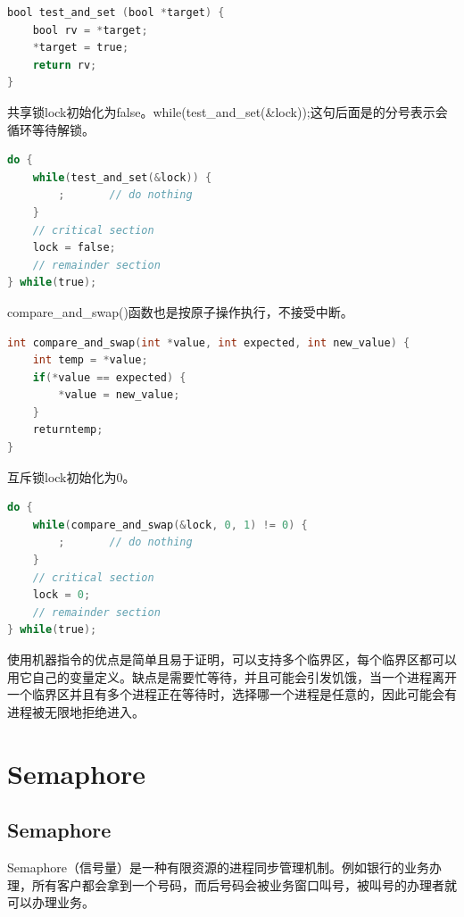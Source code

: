 \begin{lstlisting}[language=C]
bool test_and_set (bool *target) {
	bool rv = *target;
	*target = true;
	return rv;
}
\end{lstlisting}

共享锁lock初始化为false。while(test\_and\_set(\&lock));这句后面是的分号表示会循环等待解锁。

\vspace{-0.5cm}

\begin{lstlisting}[language=C]
do {
	while(test_and_set(&lock)) {
		;		// do nothing
	}
	// critical section
	lock = false;
	// remainder section
} while(true);
\end{lstlisting}

compare\_and\_swap()函数也是按原子操作执行，不接受中断。

\vspace{-0.5cm}

\begin{lstlisting}[language=C]
int compare_and_swap(int *value, int expected, int new_value) {
	int temp = *value;
	if(*value == expected) {
		*value = new_value;
	}
	returntemp;
}
\end{lstlisting}

互斥锁lock初始化为0。

\vspace{-0.5cm}

\begin{lstlisting}[language=C]
do {
	while(compare_and_swap(&lock, 0, 1) != 0) {
		;		// do nothing
	}
	// critical section
	lock = 0;
	// remainder section
} while(true);
\end{lstlisting}

使用机器指令的优点是简单且易于证明，可以支持多个临界区，每个临界区都可以用它自己的变量定义。缺点是需要忙等待，并且可能会引发饥饿，当一个进程离开一个临界区并且有多个进程正在等待时，选择哪一个进程是任意的，因此可能会有进程被无限地拒绝进入。

\newpage

\section{Semaphore}

\subsection{Semaphore}

Semaphore（信号量）是一种有限资源的进程同步管理机制。例如银行的业务办理，所有客户都会拿到一个号码，而后号码会被业务窗口叫号，被叫号的办理者就可以办理业务。\\


